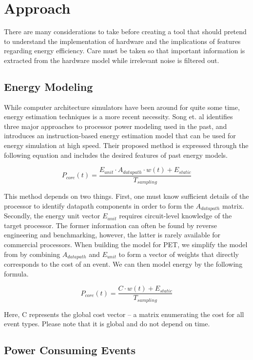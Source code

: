 \section{Approach}

There are many considerations to take before creating a tool that should pretend
to understand the implementation of hardware and the implications of features
regarding energy efficiency. Care must be taken so that important information is
extracted from the hardware model while irrelevant noise is filtered out.


\subsection{Energy Modeling}

While computer architecture simulators have been around for quite some time,
energy estimation techniques is a more recent necessity. Song et. al
\cite{song2012instruction} identifies three major approaches to processor power
modeling used in the past, and introduces an instruction-based energy
estimation model that can be used for energy simulation at high speed. Their
proposed method is expressed through the following equation and includes the
desired features of past energy models.

\[
    P_{core}(t) = \frac{E_{unit} \cdot A_{datapath} \cdot w(t) +
    E_{static}}{T_{sampling}}
\]

This method depends on two things. First, one must know sufficient details of
the processor to identify datapath components in order to form the
$A_{datapath}$ matrix. Secondly, the energy unit vector $E_{unit}$ requires
circuit-level knowledge of the target processor. The former information can
often be found by reverse engineering and benchmarking, however, the latter is
rarely available for commercial processors. When building the model for PET, we
simplify the model from \cite{song2012instruction} by combining $A_{datapath}$
and $E_{unit}$ to form a vector of weights that directly corresponds to the cost
of an event. We can then model energy by the following formula.

\[
    P_{core}(t) = \frac{C \cdot w(t) + E_{static}}{T_{sampling}}
\]

Here, C represents the global cost vector -- a matrix enumerating the cost
for all event types. Please note that it is global and do not depend on time.

\subsection{Power Consuming Events}
\label{subsec:powerevents}

